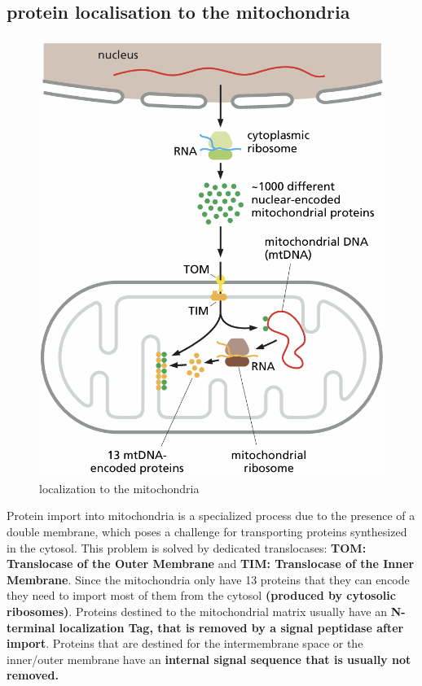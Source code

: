 \documentclass[../main.tex]{subfiles}
\begin{document}
\subsection{protein localisation to the mitochondria}
\begin{figure}[H]
    \centering
    \includegraphics[width=0.5\linewidth]{localization.png}
    \caption{localization to the mitochondria}
    \label{fig:enter-label}
\end{figure}
Protein import into mitochondria is a specialized process due to the presence of a double membrane, which poses a challenge for transporting proteins synthesized in the cytosol. This problem is solved by dedicated translocases: \textbf{TOM: Translocase of the Outer Membrane} and\textbf{ TIM: Translocase of the Inner Membrane}. Since the mitochondria only have 13 proteins that they can encode they need to import most of them from the cytosol \textbf{(produced by cytosolic ribosomes)}. Proteins destined to the mitochondrial matrix usually have an \textbf{N-terminal localization Tag, that is removed by a signal peptidase after import}. Proteins that are destined for the intermembrane space or the inner/outer membrane have an \textbf{internal signal sequence that is usually not removed.}
\end{document}
